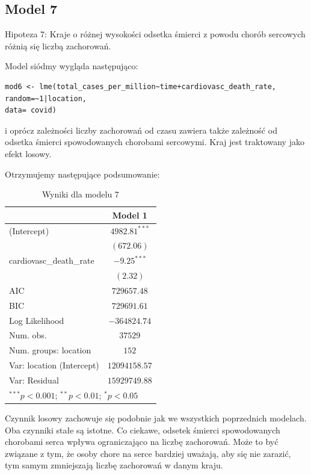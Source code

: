 \documentclass[12pt]{mwbk}
\theoremstyle{plain}
\theoremstyle{definition}
\theoremstyle{remark}
\begin{document}
\subsection{Model 7}

Hipoteza 7: Kraje o różnej wysokości odsetka śmierci z powodu chorób sercowych różnią się liczbą zachorowań.

Model siódmy wygląda następująco:

\begin{verbatim}
mod6 <- lme(total_cases_per_million~time+cardiovasc_death_rate,
random=~1|location,
data= covid)
\end{verbatim}

i oprócz zależności liczby zachorowań od czasu zawiera także zależność od odsetka śmierci spowodowanych chorobami sercowymi. Kraj jest traktowany jako efekt losowy.

Otrzymujemy następujące podsumowanie:

\begin{table}
	\begin{center}
		\begin{tabular}{l c}
			\hline
			& Model 1 \\
			\hline
			(Intercept)               & $4982.81^{***}$ \\
			& $(672.06)$      \\
			cardiovasc\_death\_rate   & $-9.25^{***}$   \\
			& $(2.32)$        \\
			\hline
			AIC                       & $729657.48$     \\
			BIC                       & $729691.61$     \\
			Log Likelihood            & $-364824.74$    \\
			Num. obs.                 & $37529$         \\
			Num. groups: location     & $152$           \\
			Var: location (Intercept) & $12094158.57$   \\
			Var: Residual             & $15929749.88$   \\
			\hline
			\multicolumn{2}{l}{\scriptsize{$^{***}p<0.001$; $^{**}p<0.01$; $^{*}p<0.05$}}
		\end{tabular}
		\caption{Wyniki dla modelu 7}
		\label{table:model7}
	\end{center}
\end{table}

Czynnik losowy zachowuje się podobnie jak we wszystkich poprzednich modelach. Oba czynniki stałe są istotne. Co ciekawe, odsetek śmierci spowodowanych chorobami serca wpływa ograniczająco na liczbę zachorowań. Może to być związane z tym, że osoby chore na serce bardziej uważają, aby się nie zarazić, tym samym zmniejszają liczbę zachorowań w danym kraju.
\end{document}

